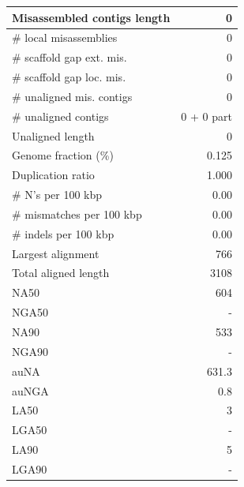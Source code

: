 \documentclass[12pt,a4paper]{article}
\begin{document}
\begin{table}[ht]
\begin{center}
\begin{tabular}{|l*{1}{|r}|}
Misassembled contigs length & 0 \\ \hline
\# local misassemblies & 0 \\ \hline
\# scaffold gap ext. mis. & 0 \\ \hline
\# scaffold gap loc. mis. & 0 \\ \hline
\# unaligned mis. contigs & 0 \\ \hline
\# unaligned contigs & 0 + 0 part \\ \hline
Unaligned length & 0 \\ \hline
Genome fraction (\%) & 0.125 \\ \hline
Duplication ratio & 1.000 \\ \hline
\# N's per 100 kbp & 0.00 \\ \hline
\# mismatches per 100 kbp & 0.00 \\ \hline
\# indels per 100 kbp & 0.00 \\ \hline
Largest alignment & 766 \\ \hline
Total aligned length & 3108 \\ \hline
NA50 & 604 \\ \hline
NGA50 & - \\ \hline
NA90 & 533 \\ \hline
NGA90 & - \\ \hline
auNA & 631.3 \\ \hline
auNGA & 0.8 \\ \hline
LA50 & 3 \\ \hline
LGA50 & - \\ \hline
LA90 & 5 \\ \hline
LGA90 & - \\ \hline
\end{tabular}
\end{center}
\end{table}
\end{document}
